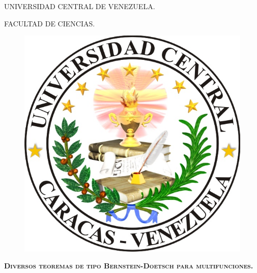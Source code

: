 
\begin{titlepage}
%


\begin{center}

UNIVERSIDAD CENTRAL DE VENEZUELA.

FACULTAD DE CIENCIAS.


\end{center}

\begin{figure}[h]
	\centering
		\includegraphics[scale=0.3]{ucv.jpg}
\end{figure}


\vspace{1cm}

\begin{large}

\begin{center}

\parbox{12cm}{
\begin{center} 
\textsc{\textbf{Diversos teoremas de tipo Bernstein-Doetsch para multifunciones.}}
\end{center}
}
\end{center}


\end{large}
\end{titlepage}
